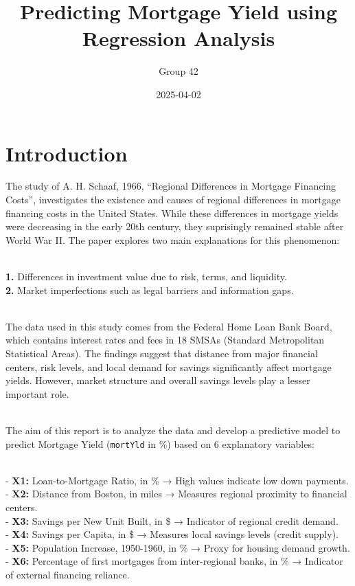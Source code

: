 \documentclass[
  11pt,
]{article}
\title{Predicting Mortgage Yield using Regression Analysis}
\author{Group 42}
\date{2025-04-02}
\begin{document}
\maketitle

\section{Introduction}\label{introduction}

The study of A. H. Schaaf, 1966, ``Regional Differences in Mortgage
Financing Costs'', investigates the existence and causes of regional
differences in mortgage financing costs in the United States. While
these differences in mortgage yields were decreasing in the early 20th
century, they suprisingly remained stable after World War II. The paper
explores two main explanations for this phenomenon:\\
\strut \\
\textbf{1.} Differences in investment value due to risk, terms, and
liquidity.\\
\textbf{2.} Market imperfections such as legal barriers and information
gaps.\\
\strut \\
The data used in this study comes from the Federal Home Loan Bank Board,
which contains interest rates and fees in 18 SMSAs (Standard
Metropolitan Statistical Areas). The findings suggest that distance from
major financial centers, risk levels, and local demand for savings
significantly affect mortgage yields. However, market structure and
overall savings levels play a lesser important role.\\
\strut \\
The aim of this report is to analyze the data and develop a predictive
model to predict Mortgage Yield (\texttt{mortYld} in \%) based on 6
explanatory variables:\\
\strut \\
- \textbf{X1:} Loan-to-Mortgage Ratio, in \% → High values indicate low
down payments.\\
- \textbf{X2:} Distance from Boston, in miles → Measures regional
proximity to financial centers.\\
- \textbf{X3:} Savings per New Unit Built, in \$ → Indicator of regional
credit demand.\\
- \textbf{X4:} Savings per Capita, in \$ → Measures local savings levels
(credit supply).\\
- \textbf{X5:} Population Increase, 1950-1960, in \% → Proxy for housing
demand growth.\\
- \textbf{X6:} Percentage of first mortgages from inter-regional banks,
in \% → Indicator of external financing reliance.
\end{document}
